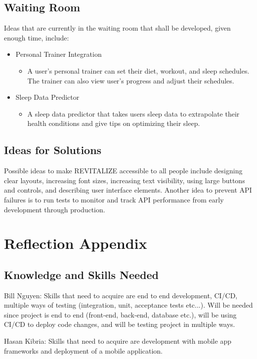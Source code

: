 \documentclass[12pt,letterpaper]{article}
\begin{document}
\subsection{Waiting Room}
Ideas that are currently in the waiting room that shall be developed, given enough time, include:
\begin{itemize}
\item Personal Trainer Integration
\begin{itemize}
\item A user's personal trainer can set their diet, workout, and sleep schedules. The trainer can also view user's progress and adjust their schedules.
\end{itemize}
\item Sleep Data Predictor
\begin{itemize}
\item A sleep data predictor that takes users sleep data to extrapolate their health conditions and give tips on optimizing their sleep.
\end{itemize}
\end{itemize}

\subsection{Ideas for Solutions}
Possible ideas to make REVITALIZE accessible to all people include designing clear layouts, increasing font sizes, increasing text visibility, using large buttons and controls, and describing user interface elements. Another idea to prevent API failures is to run tests to monitor and track API performance from early development through production.

\section{Reflection Appendix}

\subsection{Knowledge and Skills Needed}

\noindent Bill Nguyen: Skills that need to acquire are end to end development, CI/CD, multiple ways of testing (integration, unit, acceptance tests etc...). Will be needed since project is end to end (front-end, back-end, database etc.), will be using CI/CD to deploy code changes, and will be testing project in multiple ways.

\noindent Hasan Kibria: Skills that need to acquire are development with mobile app frameworks and deployment of a mobile application.
\end{document}
